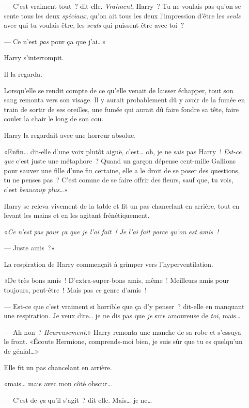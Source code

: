 --- C'est vraiment tout~? dit-elle. \emph{Vraiment}, Harry~? Tu ne voulais pas qu'on se sente tous les deux \emph{spéciaux}, qu'on ait tous les deux l'impression d'être les \emph{seuls} avec qui tu voulais être, les \emph{seuls} qui puissent être avec toi~?

--- Ce n'est \emph{pas} pour ça que j'ai…»

Harry s'interrompit.

Il la regarda.

Lorsqu'elle se rendit compte de ce qu'elle venait de laisser échapper, tout son sang remonta vers son visage. Il y aurait probablement dû y avoir de la fumée en train de sortir de ses oreilles, une fumée qui aurait dû faire fondre sa tête, faire couler la chair le long de son cou.

Harry la regardait avec une horreur absolue.

«Enfin… dit-elle d'une voix plutôt aiguë, c'est… oh, je ne sais pas Harry~! \emph{Est-ce que} c'est juste une métaphore~? Quand un garçon dépense cent-mille Gallions pour sauver une fille d'une fin certaine, elle a le droit de se poser des questions, tu ne penses pas~? C'est comme de se faire offrir des fleurs, sauf que, tu vois, c'est \emph{beaucoup plus}…»

Harry se releva vivement de la table et fit un pas chancelant en arrière, tout en levant les mains et en les agitant frénétiquement.

«\emph{Ce n'est pas pour ça que je l'ai fait~! Je l'ai fait parce qu'on est amis~!}

--- Juste amis~?»

La respiration de Harry commençait à grimper vers l'hyperventilation.

«De très bons amis~! D'extra-super-bons amis, même~! Meilleurs amis pour toujours, peut-être~! Mais pas \emph{ce} genre d'amis~!

--- Est-ce que c'est vraiment si horrible que ça d'y penser~? dit-elle en manquant une respiration. Je veux dire… je ne dis pas que \emph{je} suis amoureuse de \emph{toi}, mais…

--- Ah non~? \emph{Heureusement}.» Harry remonta une manche de sa robe et s'essuya le front. «Écoute Hermione, comprends-moi bien, je suis sûr que tu es quelqu'un de génial…»

Elle fit un pas chancelant en arrière.

«mais… mais avec mon côté obscur…

--- C'est de \emph{ça} qu'il s'agit~? dit-elle. Mais… je ne…

